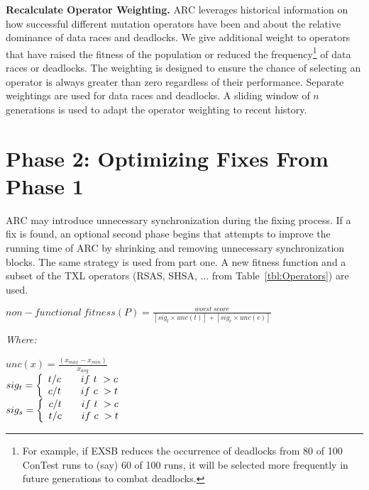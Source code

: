 \documentclass[runningheads,a4paper]{llncs}
\begin{document}
\textbf{Recalculate Operator Weighting.} ARC leverages historical information on how successful different mutation operators have been and about the relative dominance of data races and deadlocks. We give additional weight to operators that have raised the fitness of the population or reduced the frequency\footnote{For example, if EXSB reduces the occurrence of deadlocks from 80 of 100 ConTest runs to (say) 60 of 100 runs, it will be selected more frequently in future generations to combat deadlocks.} of data races or deadlocks.   The weighting is designed to ensure the chance of selecting an operator is always greater than zero regardless of their performance. Separate weightings are used for data races and deadlocks. A sliding window of $n$ generations is used to adapt the operator weighting to recent history. 

\section{Phase 2: Optimizing Fixes From Phase 1}
\label{sec:Phase2Nonfunctional}

ARC may introduce unnecessary synchronization during the fixing process. If a fix is found, an optional second phase begins that attempts to improve the running time of ARC by shrinking and removing unnecessary synchronization blocks.  The same strategy is used from part one.  A new fitness function and a subset of the TXL operators (RSAS, SHSA, ... from Table~\ref{tbl:Operators}) are used. 

\begin{footnotesize}
\begin{center}
$non-functional\ fitness(P) = \frac{worst\ score}{[sig_t \times unc(t)] + [sig_c \times unc(c)]}$
\end{center}
\vspace{0.1cm} \textit{Where:} \vspace{0.1cm}
\end{footnotesize}
\begin{scriptsize}
\begin{center}
$unc(x) = \frac{(x_{max} - x_{min})}{x_{avg}}$ \\ \vspace{0.2cm}
$
 sig_t = \left\{
 \begin{array}{l l}
   t/c & \quad if\ t\ > c \\
   c/t & \quad if\ c\ > t \\
 \end{array} \right.
$ \\ \vspace{0.2cm}
$
 sig_s = \left\{
 \begin{array}{l l}
   c/t & \quad if\ t\ > c \\
   t/c & \quad if\ c\ > t \\
 \end{array} \right.
$ \\
\end{center}
\end{scriptsize}
\end{document}
